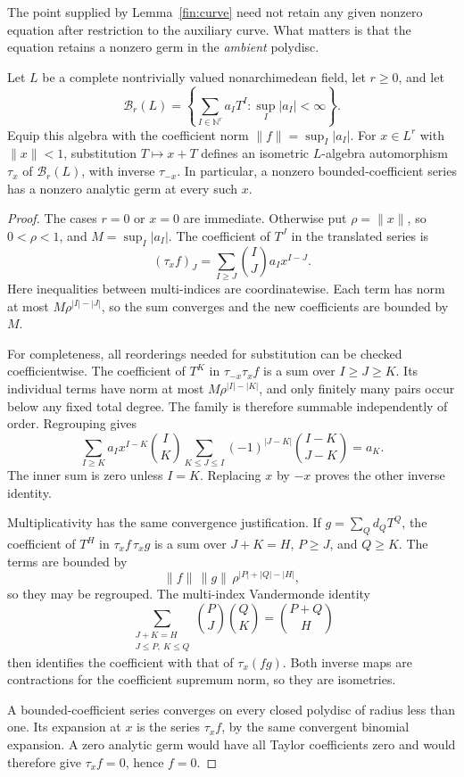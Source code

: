 The point supplied by Lemma~\ref{fin:curve} need not retain any given
nonzero equation after restriction to the auxiliary curve.  What matters
is that the equation retains a nonzero germ in the \emph{ambient}
polydisc.

\begin{lemma}\label{fin:translation}
Let \(L\) be a complete nontrivially valued nonarchimedean field,
let \(r\ge0\), and let
\[
  \mathscr B_r(L)=
  \left\{\sum_{I\in\mathbb N^r}a_I T^I:
                    \sup_I|a_I|<\infty\right\}.
\]
Equip this algebra with the coefficient norm
\(\|f\|=\sup_I|a_I|\).
For \(x\in L^r\) with \(\|x\|<1\), substitution \(T\mapsto x+T\)
defines an isometric \(L\)-algebra automorphism
\(\tau_x\) of \(\mathscr B_r(L)\), with inverse \(\tau_{-x}\).
In particular, a nonzero bounded-coefficient series has a nonzero
analytic germ at every such \(x\).
\end{lemma}

\begin{proof}
The cases \(r=0\) or \(x=0\) are immediate.  Otherwise put
\(\rho=\|x\|\), so \(0<\rho<1\), and
\(M=\sup_I|a_I|\).  The coefficient of \(T^J\) in the translated
series is
\[
  (\tau_x f)_J
    =\sum_{I\ge J}\binom IJ a_I x^{I-J}.
\]
Here inequalities between multi-indices are coordinatewise.
Each term has norm at most \(M\rho^{|I|-|J|}\), so the sum converges
and the new coefficients are bounded by \(M\).

For completeness, all reorderings needed for substitution can be checked
coefficientwise.  The coefficient of \(T^K\) in
\(\tau_{-x}\tau_x f\) is a sum over \(I\ge J\ge K\).
Its individual terms have norm at most
\(M\rho^{|I|-|K|}\), and only finitely many pairs occur below any
fixed total degree.  The family is therefore summable independently
of order.  Regrouping gives
\[
 \sum_{I\ge K} a_I x^{I-K}\binom IK
       \sum_{K\le J\le I}
          (-1)^{|J-K|}\binom{I-K}{J-K}
   =a_K.
\]
The inner sum is zero unless \(I=K\).  Replacing \(x\) by \(-x\)
proves the other inverse identity.

Multiplicativity has the same convergence justification.  If
\(g=\sum_Q d_QT^Q\), the coefficient of \(T^H\) in
\(\tau_x f\,\tau_x g\) is a sum over
\(J+K=H\), \(P\ge J\), and \(Q\ge K\).
The terms are bounded by
\[
  \|f\|\,\|g\|\,\rho^{|P|+|Q|-|H|},
\]
so they may be regrouped.  The multi-index Vandermonde identity
\[
  \sum_{\substack{J+K=H\\J\le P,\ K\le Q}}
           \binom PJ\binom QK=\binom{P+Q}{H}
\]
then identifies the coefficient with that of \(\tau_x(fg)\).
Both inverse maps are contractions for the coefficient supremum norm,
so they are isometries.

A bounded-coefficient series converges on every closed polydisc of
radius less than one.  Its expansion at \(x\) is the series
\(\tau_xf\), by the same convergent binomial expansion.
A zero analytic germ would have all Taylor coefficients zero and
would therefore give \(\tau_xf=0\), hence \(f=0\).
\end{proof}

